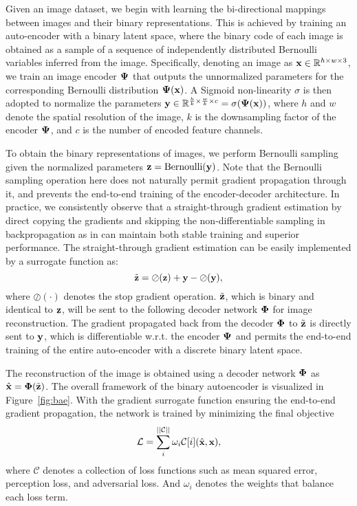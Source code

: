 \documentclass[10pt,twocolumn,letterpaper]{article}
\begin{document}
Given an image dataset, we begin with learning the bi-directional mappings between images and their binary representations.
This is achieved by training an auto-encoder with a binary latent space, where the binary code of each image is obtained as a sample of a sequence of independently distributed Bernoulli variables inferred from the image.
Specifically, denoting an image as $\textbf{x} \in \mathbb{R}^{h \times w \times 3}$, 
we train an image encoder $\boldsymbol{\Psi}$ that outputs the unnormalized parameters for the corresponding Bernoulli distribution $\boldsymbol{\Psi}(\textbf{x})$. A Sigmoid non-linearity $\sigma$ is then adopted to normalize the parameters $\textbf{y} \in \mathbb{R}^{\frac{h}{k} \times \frac{w}{k} \times c} = \sigma(\boldsymbol{\Psi}(\textbf{x}))$, where $h$ and $w$ denote the spatial resolution of the image, $k$ is the downsampling factor of the encoder $\boldsymbol{\Psi}$, and $c$ is the number of encoded feature channels. 

To obtain the binary representations of images, we perform Bernoulli sampling given the normalized parameters $\textbf{z} = \text{Bernoulli}(\textbf{y})$. Note that the Bernoulli sampling operation here does not naturally permit gradient propagation through it, and prevents the end-to-end training of the encoder-decoder architecture. 
In practice, we consistently observe that a straight-through gradient estimation by direct copying the gradients and skipping the non-differentiable sampling in backpropagation as in \cite{gumbel} can maintain both stable training and superior performance. 
The straight-through gradient estimation can be easily implemented by a surrogate function as:
\begin{equation}
\label{eq:binarize}
\small
    \tilde{\textbf{z}} = \oslash(\textbf{z}) + \textbf{y} - \oslash(\textbf{y}),
\end{equation}
where $\oslash(\cdot)$ denotes the stop gradient operation. $\tilde{\textbf{z}}$, which is binary and identical to $\textbf{z}$, will be sent to the following decoder network $\boldsymbol{\Phi}$ for image reconstruction. The gradient propagated back from the decoder $\boldsymbol{\Phi}$ to $\tilde{\textbf{z}}$ is directly sent to $\textbf{y}$, which is differentiable w.r.t. the encoder $\boldsymbol{\Psi}$ and permits the end-to-end training of the entire auto-encoder with a discrete binary latent space. 

The reconstruction of the image is obtained using a decoder network $\boldsymbol{\Phi}$ as $\hat{\textbf{x}} = \boldsymbol{\Phi}(\tilde{\textbf{z}})$. The overall framework of the binary autoencoder is visualized in Figure~\ref{fig:bae}.
With the gradient surrogate function ensuring the end-to-end gradient propagation, the network is trained by minimizing the final objective
\begin{equation}
\label{eq:train_bae}
\small
    \mathcal{L} = \sum_{i}^{||\mathcal{C}||} \omega_i \mathcal{C}[i] (\hat{\textbf{x}}, \textbf{x}),
\end{equation}
where $\mathcal{C}$ denotes a collection of loss functions such as mean squared error, perception loss, and adversarial loss. And $\omega_i$ denotes the weights that balance each loss term. 
\end{document}
